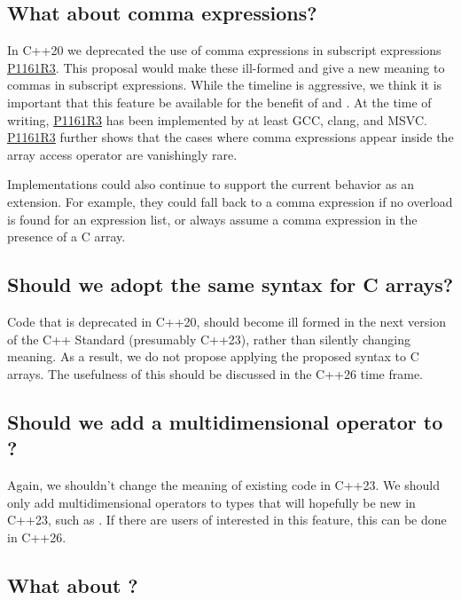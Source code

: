 \documentclass{wg21}
\begin{document}
\subsection{What about comma expressions?}

In C++20 we deprecated the use of comma expressions in subscript expressions \href{wg21.link/p1161r3}{P1161R3}.
This proposal would make these ill-formed and give a new meaning to commas in subscript expressions.
While the timeline is aggressive, we think it is important that this feature be available for the benefit of \tcode{
} and .
At the time of writing, \href{wg21.link/p1161r3}{P1161R3} has been implemented by at least GCC, clang, and MSVC.
\href{wg21.link/p1161r3}{P1161R3} further shows that the cases where comma expressions appear inside the array access operator are vanishingly rare.

Implementations could also continue to support the current behavior as an extension.  For example, they could fall back to a comma expression if no overload is found for an expression list, or always assume a comma expression in the presence of a C array.

\subsection{Should we adopt the same syntax for C arrays?}

Code that is deprecated in C++20, should become ill formed in the next version of the C++ Standard (presumably C++23),
rather than silently changing meaning.
As a result, we do not propose applying the proposed syntax to C arrays.
The usefulness of this should be discussed in the C++26 time frame.

\subsection{Should we add a multidimensional operator to ?}

Again, we shouldn't change the meaning of existing code in C++23.
We should only add multidimensional operators to types that will hopefully be new in C++23, such as .
If there are users of  interested in this feature, this can be done in C++26.

\subsection{What about \tcode{[foo][bar]}?}
\end{document}

